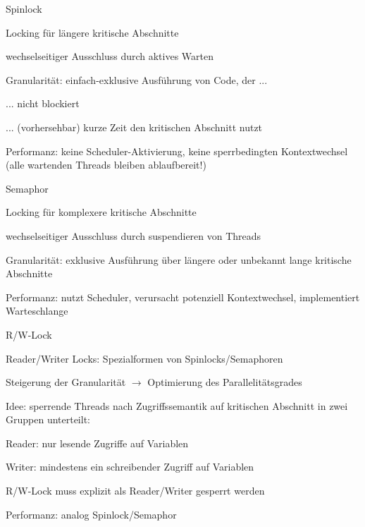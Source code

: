 \documentclass[a4paper]{article}
\begin{document}
\begin{multicols}{3}
    Spinlock
    \begin{itemize*}
        \item Locking für längere kritische Abschnitte
        \item wechselseitiger Ausschluss durch aktives Warten
        \item Granularität: einfach-exklusive Ausführung von Code, der ...
        \item ... nicht blockiert
        \item ... (vorhersehbar) kurze Zeit den kritischen Abschnitt nutzt
        \item Performanz: keine Scheduler-Aktivierung, keine sperrbedingten Kontextwechsel (alle wartenden Threads bleiben ablaufbereit!)
    \end{itemize*}

    Semaphor
    \begin{itemize*}
        \item Locking für komplexere kritische Abschnitte
        \item wechselseitiger Ausschluss durch suspendieren von Threads
        \item Granularität: exklusive Ausführung über längere oder unbekannt lange kritische Abschnitte
        \item Performanz: nutzt Scheduler, verursacht potenziell Kontextwechsel, implementiert Warteschlange
    \end{itemize*}

    R/W-Lock
    \begin{itemize*}
        \item Reader/Writer Locks: Spezialformen von Spinlocks/Semaphoren
        \item Steigerung der Granularität $\rightarrow$ Optimierung des Parallelitätsgrades
        \item Idee: sperrende Threads nach Zugriffssemantik auf kritischen Abschnitt in zwei Gruppen unterteilt:
        \item Reader: nur lesende Zugriffe auf Variablen
        \item Writer: mindestens ein schreibender Zugriff auf Variablen
        \item R/W-Lock muss explizit als Reader/Writer gesperrt werden
        \item Performanz: analog Spinlock/Semaphor
    \end{itemize*}


\end{multicols}
\end{document}
